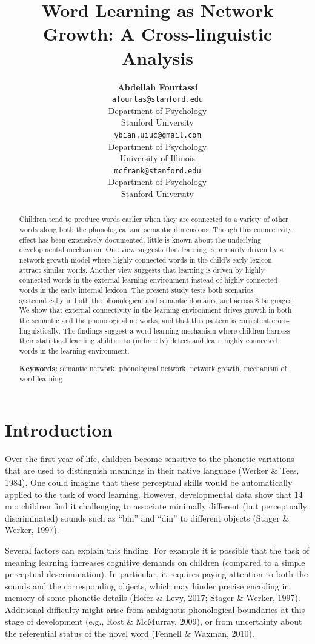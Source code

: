 \documentclass[10pt, letterpaper]{article}
\title{Word Learning as Network Growth: A Cross-linguistic Analysis}
\author{{\large \bf Abdellah Fourtassi} \\ \texttt{afourtas@stanford.edu} \\ Department of Psychology \\ Stanford University \And {\large \bf Yuan Bian} \\ \texttt{ybian.uiuc@gmail.com} \\ Department of Psychology \\ University of Illinois \And {\large \bf Michael C. Frank} \\ \texttt{mcfrank@stanford.edu} \\ Department of Psychology \\ Stanford University}
\begin{document}
\maketitle

\begin{abstract}
Children tend to produce words earlier when they are connected to a
variety of other words along both the phonological and semantic
dimensions. Though this connectivity effect has been extensively
documented, little is known about the underlying developmental
mechanism. One view suggests that learning is primarily driven by a
network growth model where highly connected words in the child's early
lexicon attract similar words. Another view suggests that learning is
driven by highly connected words in the external learning environment
instead of highly connected words in the early internal lexicon. The
present study tests both scenarios systematically in both the
phonological and semantic domains, and across 8 languages. We show that
external connectivity in the learning environment drives growth in both
the semantic and the phonological networks, and that this pattern is
consistent cross-linguistically. The findings suggest a word learning
mechanism where children harness their statistical learning abilities to
(indirectly) detect and learn highly connected words in the learning
environment.

\textbf{Keywords:}
semantic network, phonological network, network growth, mechanism of
word learning
\end{abstract}

\section{Introduction}\label{introduction}

Over the first year of life, children become sensitive to the phonetic
variations that are used to distinguish meanings in their native
language (Werker \& Tees, 1984). One could imagine that these perceptual
skills would be automatically applied to the task of word learning.
However, developmental data show that 14 m.o children find it
challenging to associate minimally different (but perceptually
discriminated) sounds such as ``bin'' and ``din'' to different objects
(Stager \& Werker, 1997).

Several factors can explain this finding. For example it is possible
that the task of meaning learning increases cognitive demands on
children (compared to a simple perceptual descrimination). In
particular, it requires paying attention to both the sounds and the
corresponding objects, which may hinder precise encoding in memory of
some phonetic details (Hofer \& Levy, 2017; Stager \& Werker, 1997).
Additional difficulty might arise from ambiguous phonological boundaries
at this stage of development (e.g., Rost \& McMurray, 2009), or from
uncertainty about the referential status of the novel word (Fennell \&
Waxman, 2010).
\end{document}
